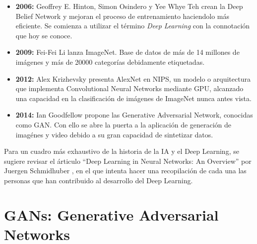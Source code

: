 \begin{itemize}
    \item \textbf{2006:} Geoffrey E. Hinton, Simon Osindero y Yee Whye Teh crean la Deep Belief Network y
    mejoran el proceso de entrenamiento haciendolo más eficiente. Se comienza a utilizar el término \emph{Deep Learning}
    con la connotación que hoy se conoce. \cite{hintonFastLearningAlgorithm2006}\\


    \item \textbf{2009:} Fei-Fei Li lanza ImageNet. Base de datos de más de 14 millones de imágenes y más de 20000
    categorías debidamente etiquetadas.\\

    \item \textbf{2012:} Alex Krizhevsky presenta AlexNet en NIPS, un modelo o arquitectura que implementa Convolutional Neural
    Networks mediante GPU, alcanzado una capacidad en la clasificación de imágenes de ImageNet nunca antes vista. \cite{krizhevskyImageNetClassificationDeep2012}\\

    \item \textbf{2014:} Ian Goodfellow propone las Generative Adversarial Network, conocidas como GAN. Con ello
    se abre la puerta a la aplicación de generación de imagénes y video debido a su gran capacidad de sintetizar datos. \cite{goodfellowGenerativeAdversarialNetworks2014}
\end{itemize}

Para un cuadro más exhaustivo de la historia de la IA y el Deep Learning, se sugiere revisar el árticulo
``Deep Learning in Neural Networks: An Overview'' por Juergen Schmidhuber \cite{schmidhuberDeepLearningNeural2015}, en el que
intenta hacer una recopilación de cada una las personas que han contribuido al desarrollo del Deep Learning.



\clearpage
\section{GANs: Generative Adversarial Networks}

